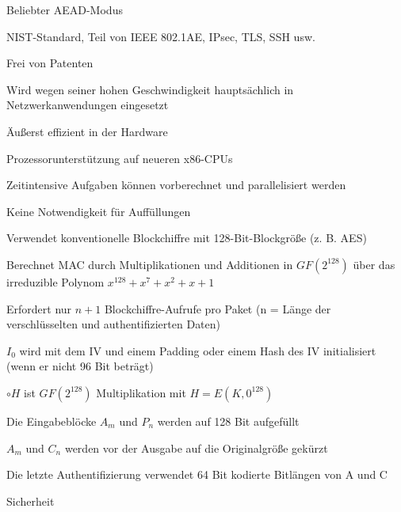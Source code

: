 \documentclass[a4paper]{article}
\begin{document}
\begin{multicols}{3}
      \begin{itemize*}
            \item Beliebter AEAD-Modus
            \item NIST-Standard, Teil von IEEE 802.1AE, IPsec, TLS, SSH usw.
            \item Frei von Patenten
            \item Wird wegen seiner hohen Geschwindigkeit hauptsächlich in
            Netzwerkanwendungen eingesetzt
            \begin{itemize*}
                  \item Äußerst effizient in der Hardware
                  \item Prozessorunterstützung auf neueren x86-CPUs
                  \item Zeitintensive Aufgaben können vorberechnet und parallelisiert werden
                  \item Keine Notwendigkeit für Auffüllungen
            \end{itemize*}
            \item Verwendet konventionelle Blockchiffre mit 128-Bit-Blockgröße (z. B.
            AES)
            \item Berechnet MAC durch Multiplikationen und Additionen in
            $GF(2^{128})$ über das irreduzible Polynom
            $x^{128}+x^{7}+x^{2}+x+1$
            \item Erfordert nur $n+1$ Blockchiffre-Aufrufe pro Paket (n = Länge der
            verschlüsselten und authentifizierten Daten)
            \begin{itemize*}
                  \item $I_0$ wird mit dem IV und einem Padding oder einem Hash des IV initialisiert (wenn er nicht 96 Bit beträgt)
                  \item $\circ H$ ist $GF(2^{128})$ Multiplikation mit $H=E(K,0^{128})$
                  \item Die Eingabeblöcke $A_m$ und $P_n$ werden auf 128 Bit aufgefüllt
                  \item $A_m$ und $C_n$ werden vor der Ausgabe auf die Originalgröße gekürzt
                  \item Die letzte Authentifizierung verwendet 64 Bit kodierte Bitlängen von A und C
            \end{itemize*}
            \item Sicherheit

\end{itemize*}
\end{multicols}
\end{document}
